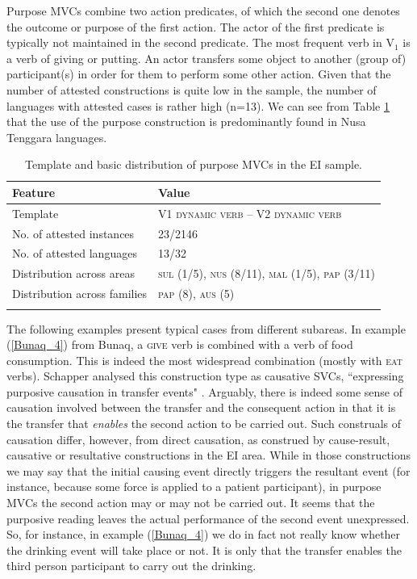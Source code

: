 Purpose MVCs combine two action predicates, of which the second one denotes the outcome or purpose of the first action. The actor of the first predicate is typically not maintained in the second predicate. The most frequent verb in V$_1$ is a verb of giving or putting. An actor transfers some object to another (group of) participant(s) in order for them to perform some other action. Given that the number of attested constructions is quite low in the sample, the number of languages with attested cases is rather high (n=13). We can see from Table \ref{table:purpose} that the use of the purpose construction is predominantly found in Nusa Tenggara languages.

\begin{table}
\begin{tabular}{ll}
\lsptoprule
Feature&Value\tabularnewline
\midrule
Template& V1 \textsc{dynamic verb} -- V2 \textsc{dynamic verb}\tabularnewline
No. of attested instances& 23/2146 \tabularnewline
No. of attested languages& 13/32 \tabularnewline
Distribution across areas& \textsc{sul} (1/5), \textsc{nus} (8/11), \textsc{mal} (1/5), \textsc{pap} (3/11) \tabularnewline
Distribution across families& \textsc{pap} (8), \textsc{aus} (5) \tabularnewline
\lspbottomrule
\end{tabular}
\caption[Template and basic distribution of purpose MVCs]{Template and basic distribution of purpose MVCs in the EI sample.}
\label{table:purpose}
\end{table}

The following examples present typical cases from different subareas. In example (\ref{Bunaq_4}) from Bunaq, a \textsc{give} verb is combined with a verb of food consumption. This is indeed the most widespread combination (mostly with \textsc{eat} verbs). Schapper analysed this construction type as causative SVCs, ``expressing purposive causation in transfer events" \citep[446]{schapper2009bunaq}. Arguably, there is indeed some sense of causation involved between the transfer and the consequent action in that it is the transfer that \emph{enables} the second action to be carried out. Such construals of causation differ, however, from direct causation, as construed by cause-result, causative or resultative constructions in the EI area. While in those constructions we may say that the initial causing event directly triggers the resultant event (for instance, because some force is applied to a patient participant), in purpose MVCs the second action may or may not be carried out. It seems that the purposive reading leaves the actual performance of the second event unexpressed. So, for instance, in example (\ref{Bunaq_4}) we do in fact not really know whether the drinking event will take place or not. It is only that the transfer enables the third person participant to carry out the drinking. 

